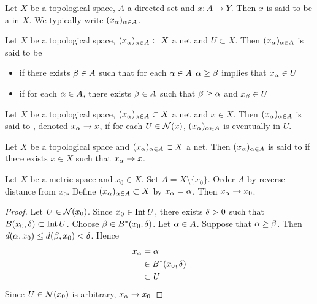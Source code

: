 \documentclass{book}
\begin{document}
	\begin{defn} 
	Let $X$ be a topological space, $A$ a directed set and $x:A \rightarrow Y$. Then $x$ is said to be a  in $X$. We typically write $(x_{\alpha})_{\alpha \in A}$. 
	\end{defn}
	
	\begin{defn} 
	Let $X$ be a topological space, $(x_{\alpha})_{\alpha \in A} \subset X$ a net and $U \subset X$.
	Then $(x_{\alpha})_{\alpha \in A}$ is said to be 
	\begin{itemize}
	\item {} if there exists $\beta \in A$ such that for each $\alpha \in A$ $\alpha \geq \beta$ implies that $x_{\alpha} \in U$
	\item {}  if for each $\alpha \in A$, there exists $\beta \in A$ such that $\beta \geq \alpha $ and $x_{\beta} \in U$
	\end{itemize}
	\end{defn}
	
	\begin{defn} 
	Let $X$ be a topological space, $(x_{\alpha})_{\alpha \in A} \subset X$ a net and $x \in X$. Then $(x_{\alpha})_{\alpha \in A}$ is said to , denoted $x_{\alpha} \rightarrow x$, if for each $U \in \mathcal{N}(x)$, $(x_{\alpha})_{\alpha \in A}$ is eventually in $U$. 
	\end{defn}	
	
	\begin{defn} 
	Let $X$ be a topological space and $(x_{\alpha})_{\alpha \in A} \subset X$ a net. Then $(x_{\alpha})_{\alpha \in A}$ is said to  if there exists $x \in X$ such that $x_{\alpha} \rightarrow x$. 
	\end{defn}	

	\begin{ex}
		Let $X$ be a metric space and $x_0 \in X$. Set $A = X \setminus \{x_0\}$. Order $A$ by reverse distance from $x_0$. Define $(x_{\alpha})_{\alpha \in A} \subset X$ by $x_{\alpha} = \alpha$. Then $x_{\alpha} \rightarrow x_0$.
	\end{ex}

	\begin{proof}
		Let $U \in \mathcal{N}(x_0)$. Since $x_0 \in \operatorname{Int} U$, there exists $\delta > 0$ such that $B(x_0, \delta) \subset \operatorname{Int} U$. Choose $\beta \in B^*(x_0, \delta)$. Let $\alpha \in A$. Suppose that $\alpha \geq \beta$. Then $d(\alpha, x_0) \leq d(\beta, x_0) < \delta$. Hence  
		\begin{align*}
			x_{\alpha} 
			&= \alpha  \\
			& \in B^*(x_0, \delta) \\
			&\subset U
		\end{align*}
		Since $U \in \mathcal{N}(x_0)$ is arbitrary, $x_{\alpha} \rightarrow x_0 $
	\end{proof}
	
\end{document}
